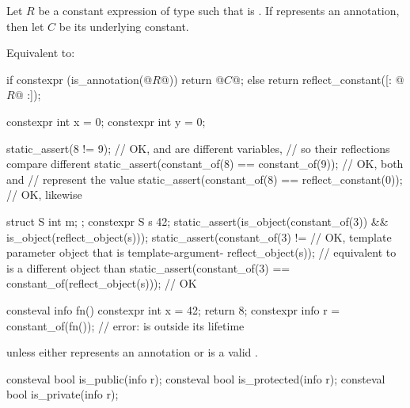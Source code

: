 \begin{itemdescr}
\pnum
Let $R$ be a constant expression of type 
such that  is .
If  represents an annotation,
then let $C$ be its underlying constant.

\pnum
\effects
Equivalent to:
\begin{codeblock}
if constexpr (is_annotation(@$R$@)) {
  return @$C$@;
} else {
  return reflect_constant([: @$R$@ :]);
}
\end{codeblock}
\begin{example}
\begin{codeblock}
constexpr int x = 0;
constexpr int y = 0;

static_assert(^^x != ^^y);                      // OK,  and  are different variables,
                                                // so their reflections compare different
static_assert(constant_of(^^x) ==
              constant_of(^^y));                // OK, both  and
                                                //  represent the value 
static_assert(constant_of(^^x) ==
              reflect_constant(0));             // OK, likewise

struct S { int m; };
constexpr S s {42};
static_assert(is_object(constant_of(^^s)) &&
              is_object(reflect_object(s)));
static_assert(constant_of(^^s) !=       // OK, template parameter object that is template-argument-
              reflect_object(s));       // equivalent to  is a different object than 
static_assert(constant_of(^^s) ==
              constant_of(reflect_object(s)));  // OK

consteval info fn() {
  constexpr int x = 42;
  return ^^x;
}
constexpr info r = constant_of(fn());           // error:  is outside its lifetime
\end{codeblock}
\end{example}

\pnum
\throws
{} unless
either  represents an annotation or
\tcode{[: $R$ :]} is a valid
.
\end{itemdescr}

%
%
%
\begin{itemdecl}
consteval bool is_public(info r);
consteval bool is_protected(info r);
consteval bool is_private(info r);
\end{itemdecl}

